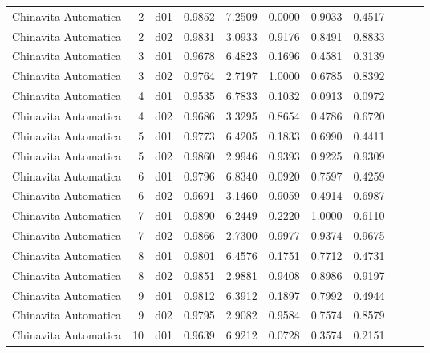 \begin{landscape}
\begin{longtable}{p{2cm}rrrrrrrrrr}
 Chinavita Automatica  &          2 &     d01 &   0.9852 &  7.2509 &        0.0000 &           0.9033 &  0.4517 \\
 Chinavita Automatica  &          2 &     d02 &   0.9831 &  3.0933 &        0.9176 &           0.8491 &  0.8833 \\
 Chinavita Automatica  &          3 &     d01 &   0.9678 &  6.4823 &        0.1696 &           0.4581 &  0.3139 \\
 Chinavita Automatica  &          3 &     d02 &   0.9764 &  2.7197 &        1.0000 &           0.6785 &  0.8392 \\
 Chinavita Automatica  &          4 &     d01 &   0.9535 &  6.7833 &        0.1032 &           0.0913 &  0.0972 \\
 Chinavita Automatica  &          4 &     d02 &   0.9686 &  3.3295 &        0.8654 &           0.4786 &  0.6720 \\
 Chinavita Automatica  &          5 &     d01 &   0.9773 &  6.4205 &        0.1833 &           0.6990 &  0.4411 \\
 Chinavita Automatica  &          5 &     d02 &   0.9860 &  2.9946 &        0.9393 &           0.9225 &  0.9309 \\
 Chinavita Automatica  &          6 &     d01 &   0.9796 &  6.8340 &        0.0920 &           0.7597 &  0.4259 \\
 Chinavita Automatica  &          6 &     d02 &   0.9691 &  3.1460 &        0.9059 &           0.4914 &  0.6987 \\
 Chinavita Automatica  &          7 &     d01 &   0.9890 &  6.2449 &        0.2220 &           1.0000 &  0.6110 \\
 Chinavita Automatica  &          7 &     d02 &   0.9866 &  2.7300 &        0.9977 &           0.9374 &  0.9675 \\
 Chinavita Automatica  &          8 &     d01 &   0.9801 &  6.4576 &        0.1751 &           0.7712 &  0.4731 \\
 Chinavita Automatica  &          8 &     d02 &   0.9851 &  2.9881 &        0.9408 &           0.8986 &  0.9197 \\
 Chinavita Automatica  &          9 &     d01 &   0.9812 &  6.3912 &        0.1897 &           0.7992 &  0.4944 \\
 Chinavita Automatica  &          9 &     d02 &   0.9795 &  2.9082 &        0.9584 &           0.7574 &  0.8579 \\
 Chinavita Automatica  &         10 &     d01 &   0.9639 &  6.9212 &        0.0728 &           0.3574 &  0.2151 \\

\end{longtable}
\end{landscape}
